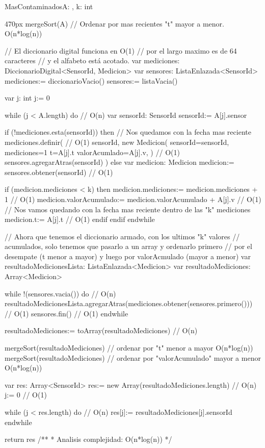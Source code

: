\documentclass[10pt,a4paper]{article}
\begin{document}
\begin{proc}{MasContaminados}{\In A: , \In k: int}{}
  \begin{ImplementationCode}{470px}
      mergeSort(A) // Ordenar por mas recientes "t" mayor a menor. O(n*log(n))

      // El diccionario digital funciona en O(1)
      // por el largo maximo es de 64 caracteres
      // y el alfabeto está acotado.
      var mediciones: DiccionarioDigital<SensorId, Medicion>
      var sensores: ListaEnlazada<SensorId>
          mediciones:= diccionarioVacio()
          sensores:= listaVacia()

      var j: int
          j:= 0

      while (j < A.length) do // O(n)
        var sensorId: SensorId
            sensorId:= A[j].sensor

        if (!mediciones.esta(sensorId)) then
          // Nos quedamos con la fecha mas reciente
          mediciones.definir( // O(1)
            sensorId,
            new Medicion(
              sensorId=sensorId,
              mediciones=1
              t=A[j].t
              valorAcumlado=A[j].v,
            ) // O(1)
            sensores.agregarAtras(sensorId)
          )
        else
          var medicion: Medicion
              medicion:= sensores.obtener(sensorId) // O(1)

          if (medicion.mediciones < k) then
            medicion.mediciones:= medicion.mediciones + 1 // O(1)
            medicion.valorAcumulado:= medicion.valorAcumulado + A[j].v // O(1)
            // Nos vamos quedando con la fecha mas reciente dentro de las "k" mediciones
            medicion.t:= A[j].t // O(1)
          endif
        endif
      endwhile

      // Ahora que tenemos el diccionario armado, con los ultimos "k" valores
      // acumulados, solo tenemos que pasarlo a un array y ordenarlo primero
      // por el desempate (t menor a mayor) y luego por valorAcmulado (mayor a menor)
      var resultadoMedicionesLista: ListaEnlazada<Medicion>
      var resultadoMediciones: Array<Medicion>

      while !(sensores.vacia()) do // O(n)
        resultadoMedicionesLista.agregarAtras(mediciones.obtener(sensores.primero())) // O(1)
        sensores.fin() // O(1)
      endwhile

      resultadoMediciones:= toArray(resultadoMediciones) // O(n)
      
      mergeSort(resultadoMediciones) // ordenar por "t" menor a mayor O(n*log(n))
      mergeSort(resultadoMediciones) // ordenar por "valorAcumulado" mayor a menor O(n*log(n))

      var res: Array<SensorId>
          res:= new Array(resultadoMediciones.length) // O(n)
          j:= 0 // O(1)

      while (j < res.length) do // O(n)
        res[j]:= resultadoMediciones[j].sensorId
      endwhile

      return res
      /**
      * Analisis complejidad: O(n*log(n))
      */
  \end{ImplementationCode}
\end{proc}
\end{document}
